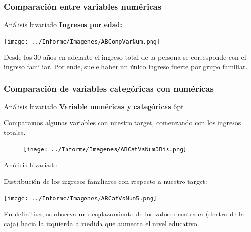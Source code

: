 \documentclass[pdf]{beamer}
\def\vspace{}%
\begin{document}
{    \subsubsection{Comparación entre variables numéricas}

\begin{frame}{Análisis bivariado}
    \textbf{Ingresos por edad:}
    \begin{center}
        \texttt{[image: ../Informe/Imagenes/ABCompVarNum.png]}
    \end{center}
    Desde los 30 años en adelante el ingreso total de la persona se corresponde con el ingreso familiar. Por ende, suele haber un único ingreso fuerte por grupo familiar.
\end{frame}
 
    \subsubsection{Comparación de variables categóricas con numéricas}
\begin{frame}{Análisis bivariado}
    \textbf{Variable numéricas y categóricas}
    \vspace{6pt}

    Comparamos algunas variables con nuestro target, comenzando con los ingresos totales.
    \begin{figure}
        \texttt{[image: ../Informe/Imagenes/ABCatVsNum3Bis.png]}
    \end{figure}

\end{frame}

\begin{frame}{Análisis bivariado}

    Distribución de los ingresos familiares con respecto a nuestro target:
    \begin{center}
        \texttt{[image: ../Informe/Imagenes/ABCatVsNum5.png]}
    \end{center}
    En definitiva, se observa un desplazamiento de los valores centrales (dentro de la caja) hacia la izquierda a medida que aumenta el nivel educativo.
\end{frame}
}
\end{document}
